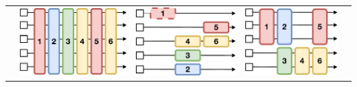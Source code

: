 \begin{table}[t]
{\begin{tabular}{c|c|c|c|c}
{\begin{minipage}{2cm}
        \end{minipage}}
        &
        \begin{minipage}{2.5cm}
            \includegraphics[width=\linewidth]{figs/fig_dschat.pdf}
        \end{minipage}
        &
        \begin{minipage}{2.3cm}
            \includegraphics[width=\linewidth]{figs/fig_openrlhf.pdf}
        \end{minipage}
        &
        \begin{minipage}{2.3cm}
            \includegraphics[width=\linewidth]{figs/fig_nemoaligner.pdf}

\end{minipage}
\end{tabular}}
\end{table}

